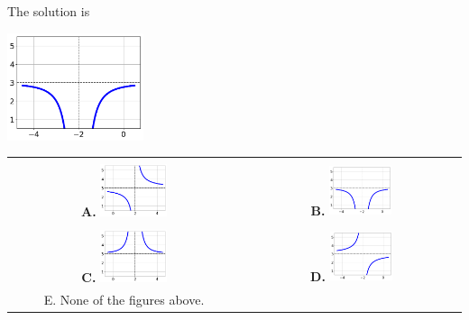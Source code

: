 \documentclass{article}[14pt]
\begin{document}
 
 The solution is  
 \begin{center} \includegraphics[width=0.3\textwidth]{../Figures/rationalEquationToGraphAB.png} \end{center}\begin{tabular}{|c|c|} 
\hline 
 & \tabularnewline 
 \textbf{A.} \includegraphics[width=0.3\textwidth]{../Figures/rationalEquationToGraphAA.png} & \textbf{B.} \includegraphics[width=0.3\textwidth]{../Figures/rationalEquationToGraphAB.png} \tabularnewline 
\hline 
 & \tabularnewline 
 \textbf{C.} \includegraphics[width=0.3\textwidth]{../Figures/rationalEquationToGraphAC.png} & \textbf{D.} \includegraphics[width=0.3\textwidth]{../Figures/rationalEquationToGraphAD.png} \tabularnewline 
\hline 
 E. None of the figures above. & \tabularnewline 
\hline 
 \end{tabular} 
 
\end{document}
